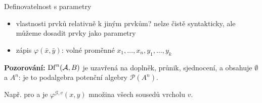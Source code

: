 \documentclass{beamer}
\begin{document}
\begin{frame}{Definovatelnost s parametry}

    \pause
    \begin{itemize}
        \item vlastnosti prvků relativně k jiným prvkům? nelze čistě syntakticky, ale můžeme dosadit prvky jako \alert{parametry}\pause
        \item zápis \alert{$\varphi(\bar x,\bar y)$}: volné proměnné $x_1,\dots,x_n,y_1,\dots,y_k$\pause
    \end{itemize}


    \pause
    \textbf{Pozorování:} $\mathrm{Df}^n(\mathcal{A},B)$ je uzavřená na doplněk, průnik, sjednocení, a obsahuje $\emptyset$ a $A^n$: je to \alert{podalgebra potenční algebry} $\mathcal P(A^n)$.

    \pause
    \medskip
    Např. pro  a  je $\varphi^{\mathcal G,v}(x,y)$ množina všech sousedů vrcholu $v$.
    
\end{frame}
\end{document}
